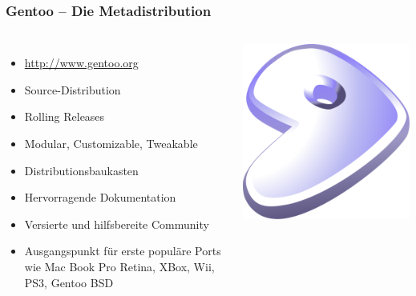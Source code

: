 \documentclass[utf8]{beamer}
\begin{document}
\begin{frame}
  \frametitle{Gentoo -- Die Metadistribution}

  \begin{columns}
        \begin{itemize}
          \item \url{http://www.gentoo.org}
          \item Source-Distribution 
          \item Rolling Releases
          \item Modular, Customizable, Tweakable
          \item Distributionsbaukasten
          \item Hervorragende Dokumentation
          \item Versierte und hilfsbereite Community
          \item Ausgangspunkt für erste populäre Ports wie Mac Book Pro Retina, XBox, Wii, PS3, Gentoo BSD
        \end{itemize}
      \hfill
      \begin{center}\includegraphics[scale=0.25]{media/Gentoo_logo.png}\end{center}
  \end{columns}

\end{frame}
\end{document}
